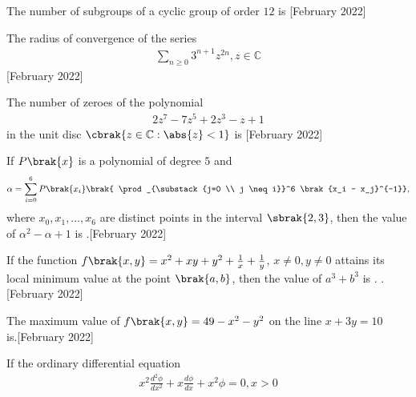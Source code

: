 \iffalse
\chapter{2022}
\author{EE24BTECH11013}
\section{ma}
\fi
\item The number of subgroups of a cyclic group of order $12$ is \underline{\hspace{1cm}} \hfill[February 2022]
   \item The radius of convergence of the series 
   \begin{align}
       \sum_{n \ge 0} 3^{n+1} z^{2n}, z \in \mathbb{C}
\end{align}\hfill[February 2022]
\item The number of zeroes of the polynomial 
\begin{align}
    2z^7-7z^5+2z^3-z+1
\end{align} 
in the unit disc $\cbrak{z \in \mathbb{C} : \abs{z}<1}$ is \underline{\hspace{2cm}} \hfill[February 2022]
\item If $P\brak{x}$ is a polynomial of degree $5$ and
\begin{align}
\alpha = \sum_{i=0}^6 P\brak{x_i} \brak{ \prod_{\substack{j=0 \\ j \neq i}}^6 \brak{x_i - x_j}^{-1}},
\end{align}
where $x_0, x_1, \dots, x_6$ are distinct points in the interval $\sbrak{2,3}$, then the value of $\alpha^2 - \alpha + 1$ is \underline{\hspace{2cm}}.\hfill[February 2022] 
\item If the function $f\brak{x, y} = x^2 + xy + y^2 + \frac{1}{x} + \frac{1}{y}$, $x \neq 0, y \neq 0$ attains its local minimum value at the point $\brak{a, b}$, then the value of $a^3 + b^3$ is \underline{\hspace{2cm}}. .\hfill[February 2022] 
\item The maximum value of $f\brak{x, y} = 49-x^2-y^2$ on the line $x+3y = 10$ \\is\underline{\hspace{2cm}}.\hfill[February 2022]
\item If the ordinary differential equation
\begin{align}
x^2 \frac{d^2 \phi}{dx^2} + x \frac{d \phi}{dx} + x^2 \phi = 0, x > 0
\end{align}

